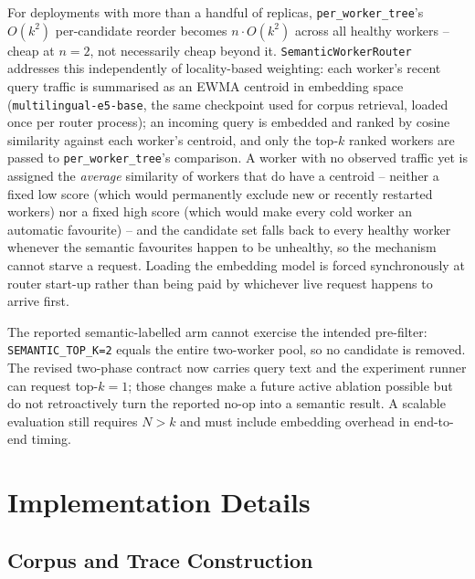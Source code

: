 \documentclass[conference]{IEEEtran}
\begin{document}
For deployments with more than a handful of replicas,
\texttt{per\_worker\_tree}'s $O(k^2)$ per-candidate reorder becomes
$n \cdot O(k^2)$ across all healthy workers -- cheap at $n{=}2$, not
necessarily cheap beyond it. \texttt{SemanticWorkerRouter} addresses
this independently of locality-based weighting: each worker's recent
query traffic is summarised as an EWMA centroid in embedding space
(\texttt{multilingual-e5-base}, the same checkpoint used for corpus
retrieval, loaded once per router process); an incoming
query is embedded and ranked by cosine similarity against each
worker's centroid, and only the top-$k$ ranked workers are passed to
\texttt{per\_worker\_tree}'s comparison. A worker with no observed
traffic yet is assigned the \emph{average} similarity of workers that
do have a centroid -- neither a fixed low score (which would
permanently exclude new or recently restarted workers) nor a fixed
high score (which would make every cold worker an automatic favourite)
-- and the candidate set falls back to every healthy worker whenever
the semantic favourites happen to be unhealthy, so the mechanism cannot
starve a request. Loading the embedding model is forced synchronously
at router start-up rather than being paid by whichever live request
happens to arrive first.

The reported semantic-labelled arm cannot exercise the intended
pre-filter: \texttt{SEMANTIC\_TOP\_K=2} equals the entire two-worker
pool, so no candidate is removed. The revised two-phase contract now
carries query text and the experiment runner can request top-$k{=}1$;
those changes make a future active ablation possible but do not
retroactively turn the reported no-op into a semantic result. A
scalable evaluation still requires $N>k$ and must include embedding
overhead in end-to-end timing.

\section{Implementation Details}

\subsection{Corpus and Trace Construction}
\end{document}
